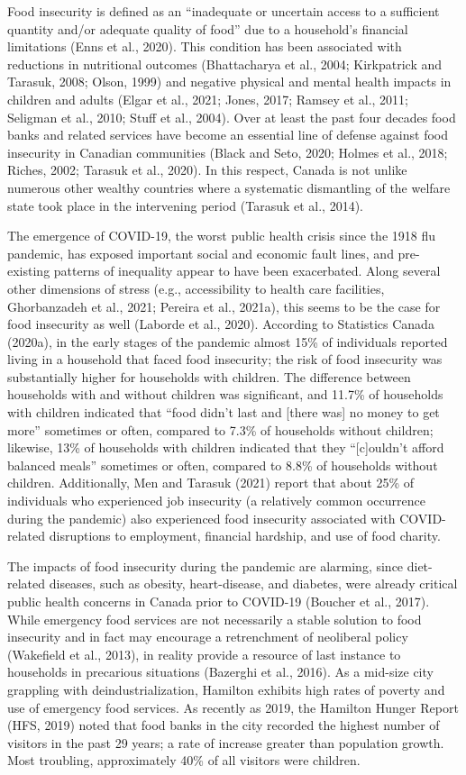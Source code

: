 \documentclass[]{elsarticle} %
\begin{document}
Food insecurity is defined as an ``inadequate or uncertain access to a
sufficient quantity and/or adequate quality of food'' due to a
household's financial limitations (Enns et al., 2020). This condition
has been associated with reductions in nutritional outcomes
(Bhattacharya et al., 2004; Kirkpatrick and Tarasuk, 2008; Olson, 1999)
and negative physical and mental health impacts in children and adults
(Elgar et al., 2021; Jones, 2017; Ramsey et al., 2011; Seligman et al.,
2010; Stuff et al., 2004). Over at least the past four decades food
banks and related services have become an essential line of defense
against food insecurity in Canadian communities (Black and Seto, 2020;
Holmes et al., 2018; Riches, 2002; Tarasuk et al., 2020). In this
respect, Canada is not unlike numerous other wealthy countries where a
systematic dismantling of the welfare state took place in the
intervening period (Tarasuk et al., 2014).

The emergence of COVID-19, the worst public health crisis since the 1918
flu pandemic, has exposed important social and economic fault lines, and
pre-existing patterns of inequality appear to have been exacerbated.
Along several other dimensions of stress (e.g., accessibility to health
care facilities, Ghorbanzadeh et al., 2021; Pereira et al., 2021a), this
seems to be the case for food insecurity as well (Laborde et al., 2020).
According to Statistics Canada (2020a), in the early stages of the
pandemic almost 15\% of individuals reported living in a household that
faced food insecurity; the risk of food insecurity was substantially
higher for households with children. The difference between households
with and without children was significant, and 11.7\% of households with
children indicated that ``food didn't last and {[}there was{]} no money
to get more'' sometimes or often, compared to 7.3\% of households
without children; likewise, 13\% of households with children indicated
that they ``{[}c{]}ouldn't afford balanced meals'' sometimes or often,
compared to 8.8\% of households without children. Additionally, Men and
Tarasuk (2021) report that about 25\% of individuals who experienced job
insecurity (a relatively common occurrence during the pandemic) also
experienced food insecurity associated with COVID-related disruptions to
employment, financial hardship, and use of food charity.

The impacts of food insecurity during the pandemic are alarming, since
diet-related diseases, such as obesity, heart-disease, and diabetes,
were already critical public health concerns in Canada prior to COVID-19
(Boucher et al., 2017). While emergency food services are not
necessarily a stable solution to food insecurity and in fact may
encourage a retrenchment of neoliberal policy (Wakefield et al., 2013),
in reality provide a resource of last instance to households in
precarious situations (Bazerghi et al., 2016). As a mid-size city
grappling with deindustrialization, Hamilton exhibits high rates of
poverty and use of emergency food services. As recently as 2019, the
Hamilton Hunger Report (HFS, 2019) noted that food banks in the city
recorded the highest number of visitors in the past 29 years; a rate of
increase greater than population growth. Most troubling, approximately
40\% of all visitors were children.
\end{document}
